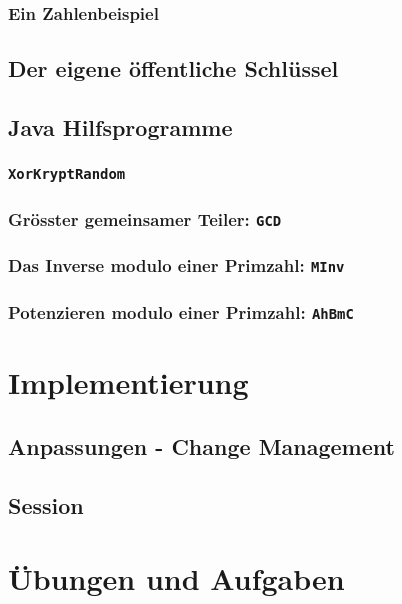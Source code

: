 \subsubsection*{Ein Zahlenbeispiel}

\subsection{Der eigene öffentliche Schlüssel}

\subsection{Java Hilfsprogramme}
\subsubsection*{\texttt{XorKryptRandom}}
\subsubsection*{Grösster gemeinsamer Teiler: \texttt{GCD}}
\subsubsection*{Das Inverse modulo einer Primzahl: \texttt{MInv}}
\subsubsection*{Potenzieren modulo einer Primzahl: \texttt{AhBmC}}

\section{Implementierung}

\subsection{Anpassungen - Change Management}

\subsection{Session}

\section{Übungen und Aufgaben}

